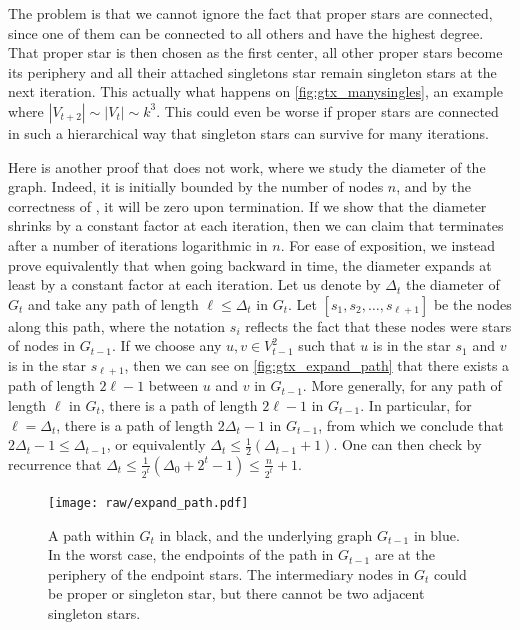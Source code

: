 The problem is that we cannot ignore the fact that proper stars are connected, since one of them can
be connected to all others and have the highest degree. That proper star is then chosen as the first
center, all other proper stars become its periphery and all their attached singletons star remain
singleton stars at the next iteration. This actually what happens on \autoref{fig:gtx_manysingles},
an example where $|V_{t+2}| \sim |V_t| \sim k^3$. This could even be worse if proper stars are
connected in such a hierarchical way that singleton stars can survive for many iterations.


Here is another proof that does not work, where we study the diameter of the graph. Indeed, it is
initially bounded by the number of nodes $n$, and by the correctness of \gtx{}, it will be zero upon
termination. If we show that the diameter shrinks by a constant factor at each iteration, then we
can claim that \gtx{} terminates after a number of iterations logarithmic in $n$. For ease of
exposition, we instead prove equivalently that when going backward in time, the diameter expands at
least by a constant factor at each iteration. Let us denote by $\Delta_t$ the diameter of $G_t$ and
take any path of length $\ell \leq \Delta_t$ in $G_t$. Let $[s_1, s_2, \ldots, s_{\ell+1}]$ be the
nodes along this path, where the notation $s_i$ reflects the fact that these nodes were stars of
nodes in $G_{t-1}$. If we choose any $u,v \in V_{t-1}^2$ such that $u$ is in the star $s_1$ and $v$
is in the star $s_{\ell+1}$, then we can see on \autoref{fig:gtx_expand_path} that there exists a
path of length $2\ell -1$ between $u$ and $v$ in $G_{t-1}$.
{\color{blue}{\large The figure actually shows this is not always true.}
More generally, for any path of length
$\ell$ in $G_t$, there is a path of length $2\ell-1$ in $G_{t-1}$. In particular, for
$\ell=\Delta_t$, there is a path of length $2\Delta_t-1$ in $G_{t-1}$, from which we conclude that
$2\Delta_t-1\leq\Delta_{t-1}$, or equivalently $\Delta_t \leq
\frac{1}{2}\left(\Delta_{t-1}+1\right)$. One can then check by recurrence that $\Delta_t \leq
\frac{1}{2^t} \left(\Delta_0+2^t-1\right) \leq \frac{n}{2^t} + 1$.}

\begin{figure}[htpb]
   \centering
   \texttt{[image: raw/expand\_path.pdf]}
   \caption[Star expansion of a path]{A path within $G_t$ in black, and the underlying graph
     $G_{t-1}$ in blue. In the worst case, the endpoints of the path in $G_{t-1}$ are at the
     periphery of the endpoint stars.  The intermediary nodes in $G_t$ could be proper or singleton
     star, but there cannot be two adjacent singleton stars.}
   \label{fig:gtx_expand_path}
\end{figure}

